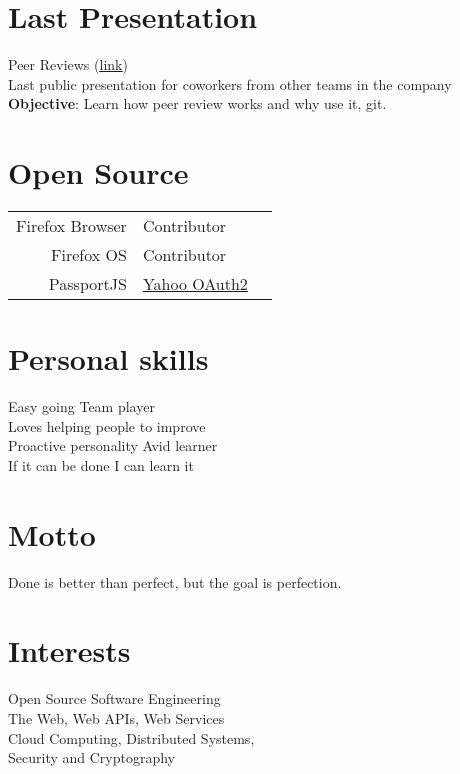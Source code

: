 \documentclass[]{resume}
\begin{document}
\hfill
\begin{minipage}[t]{0.33\textwidth}

\section{Last Presentation}
\textbullet{} Peer Reviews (\href{http://mcjimenez.github.io/presentations/peerReviewWoW}{{\underline{link}}})\\
Last public presentation for coworkers from other teams in the company\\
\textbf{Objective}: Learn how peer review works and why use it, git.
\sectionsep

\section{Open Source}
\begin{tabular}{rll}
Firefox Browser & Contributor\\
Firefox OS & Contributor\\
PassportJS & \href{https://www.npmjs.com/package/passport-yahoo-new-oauth2}{{\underline{Yahoo OAuth2}}}\\
\end{tabular}
\sectionsep


\section{Personal skills}
Easy going \textbullet{} Team player \\
Loves helping people to improve \\
Proactive personality \textbullet{} Avid learner \\
If it can be done I can learn it
\sectionsep

\section{Motto}
Done is better than perfect, but the goal is perfection.
\sectionsep

\section{Interests}
Open Source Software Engineering \\
The Web, Web APIs, Web Services \\
Cloud Computing, Distributed Systems, \\
Security and Cryptography
\sectionsep

\end{minipage}
\end{document}
